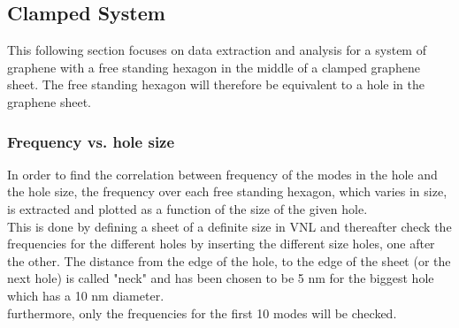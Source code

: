 \subsection{Clamped System}
This following section focuses on data extraction and analysis for a system of graphene with a free standing hexagon in the middle of a clamped graphene sheet. The free standing hexagon will therefore be equivalent to a hole in the graphene sheet.  
\subsubsection{Frequency vs. hole size}
In order to find the correlation between frequency of the modes in the hole and the hole size, the frequency over each free standing hexagon, which varies in size, is extracted and plotted as a function of the size of the given hole. \\
This is done by defining a sheet of a definite size in VNL and thereafter check the frequencies for the different holes by inserting the different size holes, one after the other. The distance from the edge of the hole, to the edge of the sheet (or the next hole) is called "neck" and has been chosen to be 5 nm for the biggest hole which has a 10 nm diameter. \\
furthermore, only the frequencies for the first 10 modes will be checked. 